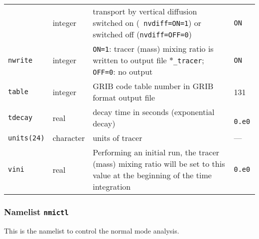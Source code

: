 \begin{longtable}{l@{\extracolsep\fill}lp{7cm}p{3.5cm}}
 & integer & transport by vertical diffusion switched on ({\tt
  nvdiff=ON=1}) or switched off ({\tt nvdiff=OFF=0}) & {\tt ON}\\
{\tt nwrite}\index{namelist variables!nwrite}
 & integer & {\tt ON=1}: tracer (mass) mixing ratio is
written to output file {\tt $\ast$\_tracer}; {\tt OFF=0}: no output &
{\tt ON}\\
{\tt table}\index{namelist variables!table} & integer & GRIB code table number in GRIB format output
file & 131 \\
{\tt tdecay}\index{namelist variables!tdecay}
 & real & decay time in seconds (exponential decay) & {\tt
  0.e0}\\
{\tt units(24)}\index{namelist variables!units}
 & character & units of tracer  & --- \\
{\tt vini}\index{namelist variables!vini}
 & real & Performing an initial run, the tracer (mass) mixing
ratio will be set to this value at the beginning of the time
integration & {\tt 0.e0}\\
\hline
\end{longtable}

\subsubsection{Namelist {\tt nmictl}}

This is the namelist to control the normal mode analysis.

\setlength{\LTcapwidth}{\textwidth}
\setlength{\LTleft}{0pt}\setlength{\LTright}{0pt}

